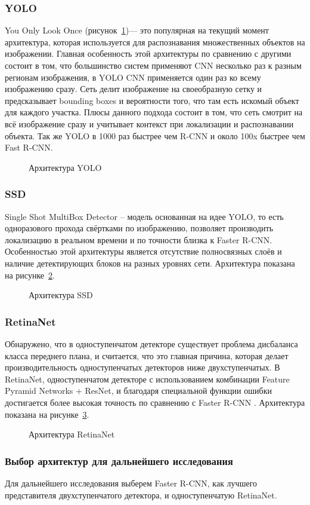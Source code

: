 \subsubsection{YOLO}
You Only Look Once \cite{yolo} (рисунок~\ref{yolo})— это популярная на текущий момент архитектура, которая используется для распознавания множественных объектов на изображении. 
Главная особенность этой архитектуры по сравнению с другими состоит в том, что большинство систем применяют CNN несколько раз к разным регионам изображения, в YOLO CNN применяется один раз ко всему изображению сразу. Сеть делит изображение на своеобразную сетку и предсказывает bounding boxes и вероятности того, что там есть искомый объект для каждого участка. Плюсы данного подхода состоит в том, что сеть смотрит на всё изображение сразу и учитывает контекст при локализации и распознавании объекта. Так же YOLO в 1000 раз быстрее чем R-CNN и около 100x быстрее чем Fast R-CNN.
\begin{figure}[h]
	\caption{Архитектура YOLO}
	\label{yolo}
\end{figure}

\subsubsection{SSD}
Single Shot MultiBox Detector \cite{ssd} -- модель основанная на идее YOLO, то есть одноразового прохода свёртками по изображению, позволяет производить локализацию в реальном времени и по точности близка к Faster R-CNN. Особенностью этой архитектуры является отсутствие полносвязных слоёв и наличие детектирующих блоков на разных уровнях сети. Архитектура показана на рисунке~\ref{ssd}.
\begin{figure}[h]
	\caption{Архитектура SSD}
	\label{ssd}
\end{figure}


\subsubsection{RetinaNet}
Обнаружено, что в одноступенчатом детекторе существует проблема дисбаланса класса переднего плана, и считается, что это главная причина, которая делает производительность одноступенчатых детекторов ниже двухступенчатых. В RetinaNet, одноступенчатом детекторе с использованием комбинации Feature Pyramid Networks + ResNet, и благодаря специальной функции ошибки достигается более высокая точность по сравнению с  Faster R-CNN \cite{retina}. Архитектура показана на рисунке~\ref{retinanet}.
\begin{figure}[h]
	\caption{Архитектура RetinaNet}
	\label{retinanet}
\end{figure}

\subsubsection{Выбор архитектур для дальнейшего исследования}
Для дальнейшего исследования выберем Faster R-CNN, как лучшего представителя двухступенчатого детектора, и одноступенчатую RetinaNet.